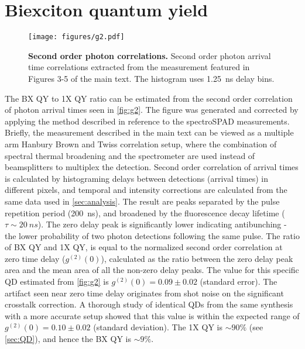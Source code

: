 \documentclass[journal=nalefd, manuscript=letter, layout=twocolumn]{achemso}
\begin{document}
\section{Biexciton quantum yield}
\begin{figure}[h]
    \centering
    \texttt{[image: figures/g2.pdf]}
    \caption{{\bf Second order photon correlations.} Second order photon arrival time correlations extracted from the measurement featured in Figures 3-5 of the main text. The histogram uses \SI{1.25}{ns} delay bins.}
    \label{fig:g2}
\end{figure}
The BX QY to 1X QY ratio can be estimated from the second order correlation of photon arrival times seen in \autoref{fig:g2}. The figure was generated and corrected by applying the method described in reference\cite{Lubin2019} to the spectroSPAD measurements. Briefly, the measurement described in the main text can be viewed as a multiple arm Hanbury Brown and Twiss correlation setup, where the combination of spectral thermal broadening and the spectrometer are used instead of beamsplitters to multiplex the detection. Second order correlation of arrival times is calculated by histograming delays between detections (arrival times) in different pixels, and temporal and intensity corrections are calculated from the same data used in \autoref{sec:analysis}. The result are peaks separated by the pulse repetition period (\SI{200}{ns}), and broadened by the fluorescence decay lifetime ($\tau{\sim}\SI{20}{ns}$). The zero delay peak is significantly lower indicating antibunching - the lower probability of two photon detections following the same pulse. The ratio of BX QY and 1X QY, is equal to the normalized second order correlation at zero time delay ($g^{(2)}(0)$), calculated as the ratio between the zero delay peak area and the mean area of all the non-zero delay peaks. The value for this specific QD estimated from \autoref{fig:g2} is $g^{(2)}(0)=0.09\pm0.02$ (standard error). The artifact seen near zero time delay originates from shot noise on the significant crosstalk correction. A thorough study of identical QDs from the same synthesis with a more accurate setup showed that this value is within the expected range of $g^{(2)}(0)=0.10\pm0.02$ (standard deviation)\cite{Lubin2019}. The 1X QY is ${\sim}90\%$ (see \autoref{sec:QD}), and hence the BX QY is ${\sim}9\%$.
\end{document}
